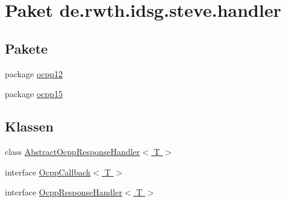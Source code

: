 \hypertarget{namespacede_1_1rwth_1_1idsg_1_1steve_1_1handler}{\section{Paket de.\+rwth.\+idsg.\+steve.\+handler}
\label{namespacede_1_1rwth_1_1idsg_1_1steve_1_1handler}
}
\subsection*{Pakete}
\begin{DoxyCompactItemize}
\item 
package \hyperlink{namespacede_1_1rwth_1_1idsg_1_1steve_1_1handler_1_1ocpp12}{ocpp12}
\item 
package \hyperlink{namespacede_1_1rwth_1_1idsg_1_1steve_1_1handler_1_1ocpp15}{ocpp15}
\end{DoxyCompactItemize}
\subsection*{Klassen}
\begin{DoxyCompactItemize}
\item 
class \hyperlink{classde_1_1rwth_1_1idsg_1_1steve_1_1handler_1_1_abstract_ocpp_response_handler_3_01_t_01_4}{Abstract\+Ocpp\+Response\+Handler$<$ T $>$}
\item 
interface \hyperlink{interfacede_1_1rwth_1_1idsg_1_1steve_1_1handler_1_1_ocpp_callback_3_01_t_01_4}{Ocpp\+Callback$<$ T $>$}
\item 
interface \hyperlink{interfacede_1_1rwth_1_1idsg_1_1steve_1_1handler_1_1_ocpp_response_handler_3_01_t_01_4}{Ocpp\+Response\+Handler$<$ T $>$}
\end{DoxyCompactItemize}
